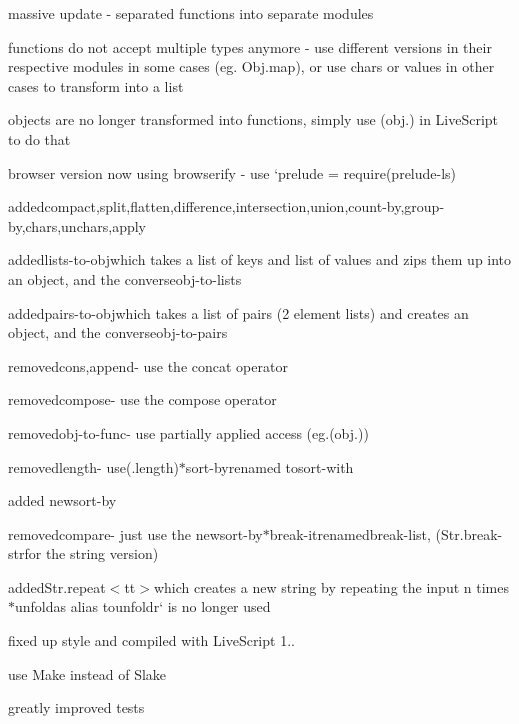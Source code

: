 \begin{DoxyItemize}
\item massive update -\/ separated functions into separate modules
\item functions do not accept multiple types anymore -\/ use different versions in their respective modules in some cases (eg. {\ttfamily Obj.\+map}), or use {\ttfamily chars} or {\ttfamily values} in other cases to transform into a list
\item objects are no longer transformed into functions, simply use {\ttfamily (obj.)} in Live\+Script to do that
\item browser version now using browserify -\/ use `prelude = require(\textquotesingle{}prelude-\/ls\textquotesingle{}){\ttfamily }
\item {\ttfamily added}compact{\ttfamily ,}split{\ttfamily ,}flatten{\ttfamily ,}difference{\ttfamily ,}intersection{\ttfamily ,}union{\ttfamily ,}count-\/by{\ttfamily ,}group-\/by{\ttfamily ,}chars{\ttfamily ,}unchars{\ttfamily ,}apply{\ttfamily }
\item {\ttfamily added}lists-\/to-\/obj{\ttfamily which takes a list of keys and list of values and zips them up into an object, and the converse}obj-\/to-\/lists{\ttfamily }
\item {\ttfamily added}pairs-\/to-\/obj{\ttfamily which takes a list of pairs (2 element lists) and creates an object, and the converse}obj-\/to-\/pairs{\ttfamily }
\item {\ttfamily removed}cons{\ttfamily ,}append{\ttfamily -\/ use the concat operator}
\item {\ttfamily removed}compose{\ttfamily -\/ use the compose operator}
\item {\ttfamily removed}obj-\/to-\/func{\ttfamily -\/ use partially applied access (eg.}(obj.){\ttfamily )}
\item {\ttfamily removed}length{\ttfamily -\/ use}(.length){\ttfamily  $\ast$}sort-\/by{\ttfamily renamed to}sort-\/with{\ttfamily }
\item {\ttfamily added new}sort-\/by{\ttfamily }
\item {\ttfamily removed}compare{\ttfamily -\/ just use the new}sort-\/by{\ttfamily  $\ast$}break-\/it{\ttfamily renamed}break-\/list{\ttfamily , (}Str.\+break-\/str{\ttfamily for the string version)}
\item {\ttfamily added}Str.\+repeat$<$tt$>$which creates a new string by repeating the input n times $\ast$unfold{\ttfamily as alias to}unfoldr` is no longer used
\item fixed up style and compiled with Live\+Script 1..
\item use Make instead of Slake
\item greatly improved tests
\end{DoxyItemize}

